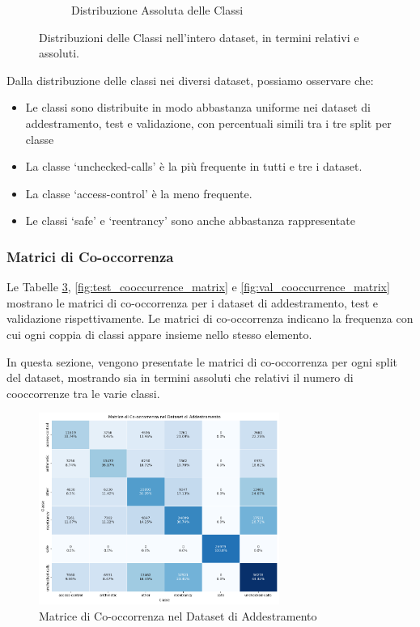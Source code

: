 \documentclass[../../Thesis.tex]{subfiles}
\begin{document}
\begin{figure}[h!]
\begin{subfigure}[b]{0.45\linewidth}
      \caption{Distribuzione Assoluta delle Classi}
      \label{fig:absolute_distribution}
    \end{subfigure}
    \caption{Distribuzioni delle Classi nell'intero dataset, in termini relativi e assoluti.}
    \label{fig:class_distributions}
  \end{figure}
  Dalla distribuzione delle classi nei diversi dataset, possiamo osservare che:

  \begin{itemize}
      \item Le classi sono distribuite in modo abbastanza uniforme nei dataset di addestramento, test e validazione, con percentuali simili tra i tre split per classe
      \item La classe `unchecked-calls' \`e la pi\`u frequente in tutti e tre i dataset.
      \item La classe `access-control' \`e la meno frequente.
      \item Le classi `safe' e `reentrancy' sono anche abbastanza rappresentate
  \end{itemize}
\subsubsection{Matrici di Co-occorrenza}
Le Tabelle \ref{fig:train_cooccurrence_matrix}, \ref{fig:test_cooccurrence_matrix} e \ref{fig:val_cooccurrence_matrix} mostrano le matrici di co-occorrenza per i dataset di addestramento, test e validazione rispettivamente. Le matrici di co-occorrenza indicano la frequenza con cui ogni coppia di classi appare insieme nello stesso elemento.

In questa sezione, vengono presentate le matrici di co-occorrenza per ogni split del dataset, mostrando sia in termini assoluti che relativi il numero di cooccorrenze tra le varie classi.

\begin{figure}[H]
    \centering
    \includegraphics[width=0.7\textwidth]{../../img/TrainCo-occurrency.png}
    \caption{Matrice di Co-occorrenza nel Dataset di Addestramento}
    \label{fig:train_cooccurrence_matrix}
\end{figure}
\end{document}
